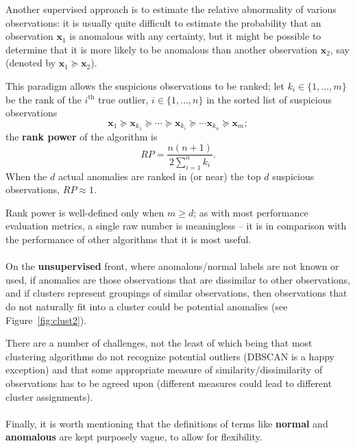 \documentclass[20pt,landscape,footrule,headrule]{foils}
\begin{document}
\begin{center}
\newpage \noindent Another supervised approach is to estimate the relative abnormality of various observations: it is usually quite difficult to estimate the probability that an observation $\mathbf{x}_1$ is anomalous with any certainty, but it might be possible to determine that it is more likely to be anomalous than another observation $\mathbf{x}_2$, say (denoted by $\mathbf{x}_1\succeq \mathbf{x}_2$).\label{succeq} %
\par This paradigm allows the suspicious observations to be ranked; let $k_i\in\{1,\ldots,m\}$ be the rank of the $i^{\text{th}}$ true outlier, $i\in \{1,\ldots,n\}$ in the sorted list of suspicious observations $$\mathbf{x}_1\succeq \mathbf{x}_{k_1}\succeq \cdots\succeq\mathbf{x}_{k_i}\succeq \cdots \mathbf{x}_{k_n}\succeq \mathbf{x}_m;$$ the \textbf{rank power} of the algorithm is $$RP=\frac{n(n+1)}{2\sum_{i=1}^nk_i}.$$ When the $d$ actual anomalies are ranked in (or near) the top $d$ suspicious observations, $RP\approx 1$. \par Rank power is well-defined only when $m\geq d$; as with most performance evaluation metrics, a single raw number is meaningless -- it is in comparison with the performance of other algorithms that it is most useful.   \ \\ \ \\ On the \textbf{unsupervised} front, where anomalous/normal labels are not known or used, if anomalies are those observations that are dissimilar to other observations, and if clusters represent groupings of similar observations, then observations that do not naturally fit into a cluster could be potential anomalies (see Figure~\ref{fig:clust2}). \par There are a number of challenges, not the least of which being that most clustering algorithms do not recognize potential outliers (DBSCAN is a happy exception) and that some appropriate measure of similarity/dissimilarity of observations has to be agreed upon (different measures could lead to different cluster assignments).  \ \\ \ \\ Finally, it is worth mentioning that the definitions of terms like \textbf{normal} and \textbf{anomalous} are kept purposely vague, to allow for flexibility. 
\begin{center}

\end{center}
\end{center}
\end{document}
